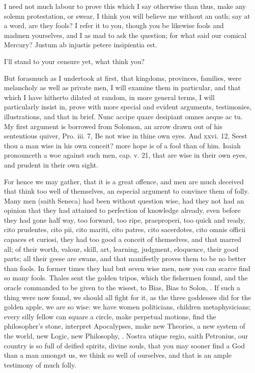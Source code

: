 {I need not much labour to prove this which I say otherwise than thus,
make any solemn protestation, or swear, I think you will believe me
without an oath; say at a word, are they fools? I refer it to you,
though you be likewise fools and madmen yourselves, and I as mad to ask
the question; for what said our comical Mercury?
Justum ab injustis petere insipientia est.

I'll stand to your censure yet, what think you?

But forasmuch as I undertook at first, that kingdoms, provinces,
families, were melancholy as well as private men, I will examine them
in particular, and that which I have hitherto dilated at random, in
more general terms, I will particularly insist in, prove with more
special and evident arguments, testimonies, illustrations, and that in
brief. Nunc accipe quare desipiant omnes aeque ac tu. My first
argument is borrowed from Solomon, an arrow drawn out of his
sententious quiver, Pro. iii. 7, Be not wise in thine own eyes. And
xxvi. 12, Seest thou a man wise in his own conceit? more hope is of a
fool than of him. Isaiah pronounceth a woe against such men, cap. v.
21, that are wise in their own eyes, and prudent in their own sight.

For hence we may gather, that it is a great offence, and men are much
deceived that think too well of themselves, an especial argument to
convince them of folly. Many men (saith Seneca) had been without
question wise, had they not had an opinion that they had attained to
perfection of knowledge already, even before they had gone half way,
too forward, too ripe, praeproperi, too quick and ready, cito
prudentes, cito pii, cito mariti, cito patres, cito sacerdotes, cito
omnis officii capaces et curiosi, they had too good a conceit of
themselves, and that marred all; of their worth, valour, skill, art,
learning, judgment, eloquence, their good parts; all their geese are
swans, and that manifestly proves them to be no better than fools. In
former times they had but seven wise men, now you can scarce find so
many fools. Thales sent the golden tripos, which the fishermen found,
and the oracle commanded to be  given to the wisest, to Bias, Bias
to Solon, \etc{}. If such a thing were now found, we should all fight for
it, as the three goddesses did for the golden apple, we are so wise: we
have women politicians, children metaphysicians; every silly fellow can
square a circle, make perpetual motions, find the philosopher's stone,
interpret Apocalypses, make new Theories, a new system of the world,
new Logic, new Philosophy, \etc{}. Nostra utique regio, saith
Petronius, our country is so full of deified spirits, divine
souls, that you may sooner find a God than a man amongst us, we think
so well of ourselves, and that is an ample testimony of much folly.

}
